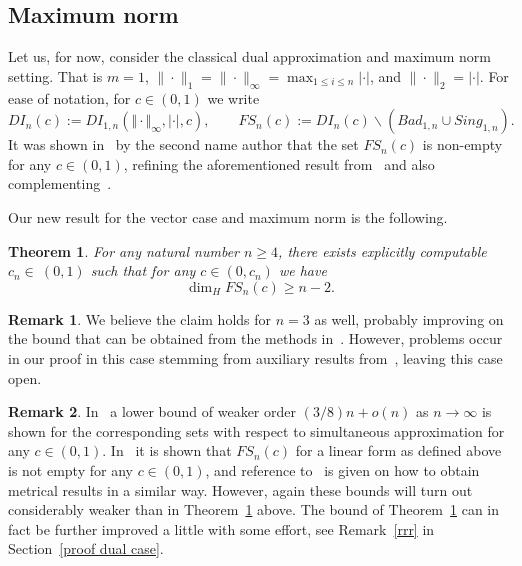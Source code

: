 \documentclass[10pt]{amsart}
\newtheorem{theorem}{Theorem}[section]
\theoremstyle{definition}
\newtheorem{remark}{Remark}
\begin{document}
\subsection{Maximum norm}
Let us, for now, consider the classical dual approximation and maximum norm setting. That is $m=1$, $\|\cdot\|_{1}=\|\cdot\|_{\infty}=\max_{1\leq i \leq n}|\cdot|$, and $\|\cdot\|_{2}=|\cdot|$. For ease of notation,
for $c\in (0,1)$ we write $$
DI_{n}(c)
:=DI_{1,n}(\Vert\cdot\Vert_{\infty},\vert\cdot\vert,c),
\qquad FS_{n}(c):=DI_{n}(c)\backslash \left( Bad_{1,n} \cup Sing_{1,n} \right).
$$ 
It was shown in~\cite{j2} by the second name author that the set $FS_n(c)$ is non-empty for any $c\in (0,1)$, refining the aforementioned result from~\cite{BerGuaMarRamVel}
and also complementing~\cite{Dasetal}. \par 

Our new result for the vector case and maximum norm is the following.

\begin{theorem}  \label{thm1}
 	For any natural number $n\ge 4$, there exists explicitly computable $c_n\in~(0,1)$ such that for any $c\in (0,c_n)$ we have
  \begin{equation*}
      \dim_H FS_{n}(c)\geq n-2.
  \end{equation*}
 \end{theorem}




\begin{remark}
	We believe the claim holds for $n=3$ as well, probably improving on the bound that can be obtained from the methods in~\cite{j1, j2}. However, problems occur in our proof in this case stemming from 
 auxiliary results from~\cite{ngm}, leaving this case open.
\end{remark}

\begin{remark} \label{remark4}
	In~\cite{j1} a lower bound of weaker order $(3/8)n+o(n)$ as $n\to\infty$ is shown for the corresponding sets with respect to simultaneous approximation for any $c\in (0,1)$. 
	In~\cite{j2} it is shown that $FS_n(c)$ for a linear form as defined above
	is not empty for any $c\in (0,1)$, and reference to~\cite{j1} is given on how to obtain metrical results in a similar way. However, again these bounds will turn out considerably weaker than in Theorem~\ref{thm1} above. The bound of Theorem~\ref{thm1} can in fact be further improved a little with some effort, see Remark~\ref{rrr} in Section~\ref{proof dual case}.
\end{remark}
\end{document}
